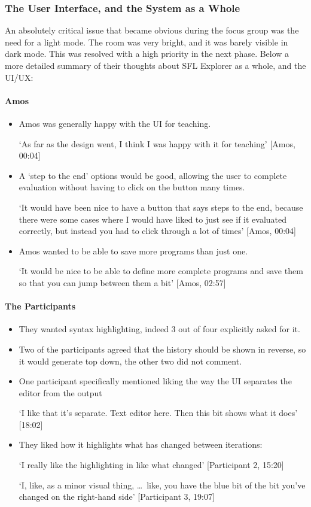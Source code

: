 \subsubsection{The User Interface, and the System as a Whole}
An absolutely critical issue that became obvious during the focus group was the need for a light mode. The room was very bright, and it was barely visible in dark mode. This was resolved with a high priority in the next phase. 
Below a more detailed summary of their thoughts about SFL Explorer as a whole, and the UI/UX:

\paragraph{Amos}\begin{itemize}
    \item Amos was generally happy with the UI for teaching.
    
    `As far as the design went, I think I was happy with it for teaching' [Amos, 00:04]
    \item A `step to the end' options would be good, allowing the user to complete evaluation without having to click on the button many times.
    
    `It would have been nice to have a button that says steps to the end, because there were some cases where I would have liked to just see if it evaluated correctly, but
    instead you had to click through a lot of times' [Amos, 00:04]
    \item Amos wanted to be able to save more programs than just one.
    
    `It would be nice to be able to define more complete programs and save them so that you can jump between them a bit' [Amos, 02:57]
\end{itemize}

\paragraph{The Participants}\begin{itemize}
    \item They wanted syntax highlighting, indeed 3 out of four explicitly asked for it. 

    \item Two of the participants agreed that the history should be shown in reverse, so it would generate top down, the other two did not comment. 
    \item One participant specifically mentioned liking the way the UI separates the editor from the output
    
    `I like that it's separate. Text editor here. Then this bit shows what it does' [18:02]
    \item They liked how it highlights what has changed between iterations:
    
    `I really like the highlighting in like what changed' [Participant 2, 15:20]
    
    `I, like, as a minor visual thing, \dots\ like, you have the blue bit of the bit you've changed on the right-hand side' [Participant 3, 19:07]
\end{itemize}


